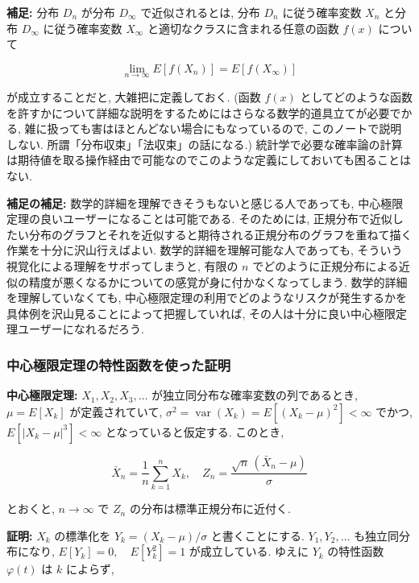 \documentclass[10pt, a4paper,xelatex,ja=standard]{bxjsarticle}
\newcommand\op{\operatorname}
\newcommand\var{\op{var}}
\begin{document}
\textbf{補足:} 分布 \(D_n\) が分布 \(D_\infty\) で近似されるとは, 分布
\(D_n\) に従う確率変数 \(X_n\) と分布 \(D_\infty\) に従う確率変数
\(X_\infty\) と適切なクラスに含まれる任意の函数 \(f(x)\) について

\[
\lim_{n\to\infty} E[f(X_n)] = E[f(X_\infty)]
\]

が成立することだと, 大雑把に定義しておく. (函数 \(f(x)\)
としてどのような函数を許すかについて詳細な説明をするためにはさらなる数学的道具立てが必要でかる,
雑に扱っても害はほとんどない場合にもなっているので,
このノートで説明しない. 所謂「分布収束」「法収束」の話になる.)
統計学で必要な確率論の計算は期待値を取る操作経由で可能なのでこのような定義にしておいても困ることはない.

\textbf{補足の補足:} 数学的詳細を理解できそうもないと感じる人であっても,
中心極限定理の良いユーザーになることは可能である. そのためには,
正規分布で近似したい分布のグラフとそれを近似すると期待される正規分布のグラフを重ねて描く作業を十分に沢山行えばよい.
数学的詳細を理解可能な人であっても,
そういう視覚化による理解をサボってしまうと, 有限の \(n\)
でどのように正規分布による近似の精度が悪くなるかについての感覚が身に付かなくなってしまう.
数学的詳細を理解していなくても,
中心極限定理の利用でどのようなリスクが発生するかを具体例を沢山見ることによって把握していれば,
その人は十分に良い中心極限定理ユーザーになれるだろう.

    \hypertarget{ux4e2dux5fc3ux6975ux9650ux5b9aux7406ux306eux7279ux6027ux51fdux6570ux3092ux4f7fux3063ux305fux8a3cux660e}{%
\subsubsection{中心極限定理の特性函数を使った証明}\label{ux4e2dux5fc3ux6975ux9650ux5b9aux7406ux306eux7279ux6027ux51fdux6570ux3092ux4f7fux3063ux305fux8a3cux660e}}

\textbf{中心極限定理:} \(X_1, X_2, X_3, \ldots\)
が独立同分布な確率変数の列であるとき, \(\mu=E[X_k]\) が定義されていて,
\(\sigma^2 = \var(X_k) = E[(X_k - \mu)^2] < \infty\) でかつ,
\(E[|X_k - \mu|^3] < \infty\) となっていると仮定する. このとき,

\[
\bar{X}_n = \frac{1}{n}\sum_{k=1}^n X_k, \quad
Z_n = \frac{\sqrt{n}\,(\bar{X}_n - \mu)}{\sigma}
\]

とおくと, \(n\to\infty\) で \(Z_n\) の分布は標準正規分布に近付く.

\textbf{証明:} \(X_k\) の標準化を \(Y_k = (X_k - \mu)/\sigma\)
と書くことにする. \(Y_1, Y_2, \ldots\) も独立同分布になり,
\(E[Y_k] = 0, \quad E[Y_k^2] = 1\) が成立している. ゆえに \(Y_k\)
の特性函数 \(\varphi(t)\) は \(k\) によらず,
\end{document}
